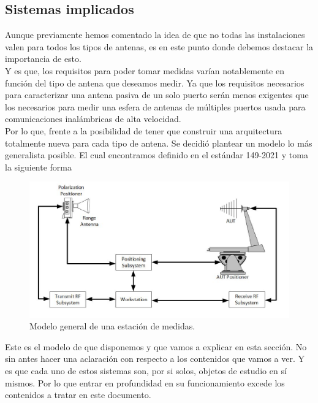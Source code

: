 \documentclass{article}
\begin{document}
\subsection{Sistemas implicados} 

Aunque previamente hemos comentado la idea de que no todas las instalaciones valen para todos los tipos de antenas, es en este punto donde debemos destacar la importancia de esto.\\ 

Y es que, los requisitos para poder tomar medidas varían notablemente en función del tipo de antena que deseamos medir. Ya que los requisitos necesarios para caracterizar una antena pasiva de un solo puerto serán menos exigentes que los necesarios para medir una esfera de antenas de múltiples puertos usada para comunicaciones inalámbricas de alta velocidad. 
\\

Por lo que, frente a la posibilidad de tener que construir una arquitectura totalmente nueva para cada tipo de antena. Se decidió plantear un modelo lo más generalista posible. El cual encontramos definido en el estándar 149-2021 y toma la siguiente forma
\newpage

\begin{figure}[h]
    \centering
    \includegraphics[scale=0.65]{Figura3-Modelo de una estacion completa de medidas}
    \caption{Modelo general de una estación de medidas.}
    \label{Modelo-general-de-una-estación-de-medidas}
\end{figure}

Este es el modelo de que disponemos y que vamos a explicar en esta sección. No sin antes hacer una aclaración con respecto a los contenidos que vamos a ver. Y es que cada uno de estos sistemas son, por si solos, objetos de estudio en sí mismos. Por lo que entrar en profundidad en su funcionamiento excede los contenidos a tratar en este documento.
\\
\end{document}

